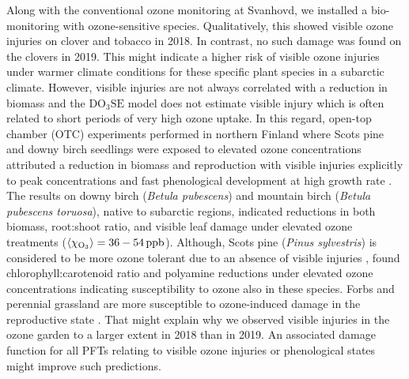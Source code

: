 \documentclass[bg, manuscript]{copernicus}
\begin{document}
Along with the conventional ozone monitoring at Svanhovd, we installed a bio-monitoring with ozone-sensitive species. Qualitatively, this showed visible ozone injuries on clover and tobacco in 2018. In contrast, no such damage was found on the clovers in 2019. This might indicate a higher risk of visible ozone injuries under warmer climate conditions for these specific plant species in a subarctic climate. However, visible injuries are not always correlated with a reduction in biomass \citep[and citations therein]{CRG:Felzer2007} and the $\mathrm{DO_3SE}$ model does not estimate visible injury which is often related to short periods of very high ozone uptake. In this regard, open-top chamber (OTC) experiments performed in northern Finland where Scots pine and downy birch seedlings were exposed to elevated ozone concentrations attributed a reduction in biomass and reproduction with visible injuries explicitly to peak  concentrations and fast phenological development at high growth rate \citep{Amb:Manninen2009}. The \citet{Amb:Manninen2009} results on downy birch (\emph{Betula pubescens}) and mountain birch (\emph{Betula pubescens toruosa}), native to subarctic regions, indicated reductions in both biomass, root:shoot ratio, and visible leaf damage under elevated ozone treatments ($\left<\chem{\chi_{O_3}}\right> = 36-54\,\unit{ppb}$). Although, Scots pine (\emph{Pinus sylvestris}) is considered to be more ozone tolerant due to an absence of visible injuries \citep{Amb:Girgzdiene2009}, \citet{Amb:Manninen2009} found chlorophyll:carotenoid ratio and polyamine reductions under elevated ozone concentrations indicating susceptibility to ozone also in these species. Forbs and perennial grassland are more susceptible to ozone-induced damage in the reproductive state \citep{EP:Bassin2004}. 
That might explain why we observed visible injuries in the ozone garden to a larger extent in 2018 than in 2019. An associated damage function for all PFTs relating to visible ozone injuries or phenological states might improve such predictions.
\end{document}
